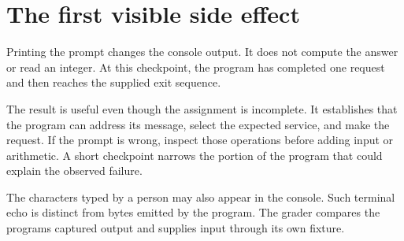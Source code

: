 \section{The first visible side
  effect}\label{001-console-calculation-p06-the-first-visible-side-effect}

Printing the prompt changes the console output. It does not compute the
answer or read an integer. At this checkpoint, the program has completed
one request and then reaches the supplied exit sequence.

The result is useful even though the assignment is incomplete. It
establishes that the program can address its message, select the
expected service, and make the request. If the prompt is wrong, inspect
those operations before adding input or arithmetic. A short checkpoint
narrows the portion of the program that could explain the observed
failure.

The characters typed by a person may also appear in the console. Such
terminal echo is distinct from bytes emitted by the program. The grader
compares the program\textquotesingle s captured output and supplies
input through its own fixture.
